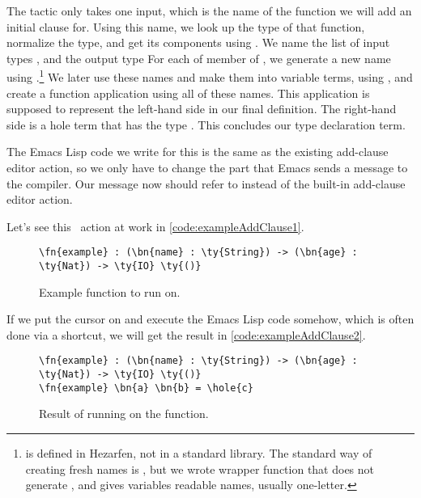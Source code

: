 The  tactic only takes one input, which is the name of the function
we will add an initial clause for.
Using this name, we look up the type of that function,
normalize the type, and get its components
using .
We name the list of input types , and the output type 
For each of member of , we generate a new name using
.\footnote{ is defined in Hezarfen, not in a standard
library. The standard way of creating fresh names is , but we wrote
wrapper function  that does not generate , and gives variables
readable names, usually one-letter.} We later use these names and make them
into variable terms, using , and create a function application using
all of these names. This application is supposed to represent the left-hand
side in our final definition. The right-hand side is a hole term that has the
type .  This concludes our type declaration term.

The Emacs Lisp code we write for this is the same as the existing add-clause
editor action, so we only have to change the part that Emacs sends a message to
the compiler. Our message now should refer to  instead of the
built-in add-clause editor action.

Let's see this \Elab\ action at work in \autoref{code:exampleAddClause1}.

\begin{figure}[H]
\caption{Example function to run  on.}
\label{code:exampleAddClause1}
\begin{Verbatim}[framesep=2mm, label=\footnotesize{\normalfont{Idris}}, labelposition=topline]
\fn{example} : (\bn{name} : \ty{String}) -> (\bn{age} : \ty{Nat}) -> \ty{IO} \ty{()}
\end{Verbatim}
\end{figure}

If we put the cursor on  and execute the Emacs Lisp code somehow, which is often done via a shortcut, we will get the result in \autoref{code:exampleAddClause2}.

\begin{figure}[H]
\caption{Result of running  on the  function.}
\label{code:exampleAddClause2}
\begin{Verbatim}[framesep=2mm, label=\footnotesize{\normalfont{Idris}}, labelposition=topline]
\fn{example} : (\bn{name} : \ty{String}) -> (\bn{age} : \ty{Nat}) -> \ty{IO} \ty{()}
\fn{example} \bn{a} \bn{b} = \hole{c}
\end{Verbatim}
\end{figure}

